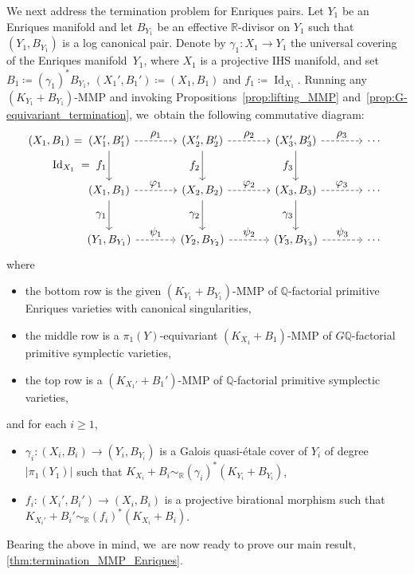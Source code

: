 \documentclass[JEP,XML,SOM,Unicode,published]{cedram}
\let\ts\textstyle
\theoremstyle{plain}
\theoremstyle{definition}
\newcommand{\Q}{\mathbb{Q}}
\newcommand{\R}{\mathbb{R}}
\DeclareMathOperator{\Id}{Id}
\begin{document}
We next address the termination problem for Enriques pairs. Let $Y_1$ be an Enriques manifold and let $B_{Y_1}$ be an effective $\R$\nobreakdash-divisor on $Y_1$ such that $(Y_1,B_{Y_1})$ is a log canonical pair. Denote by $\gamma_1 \colon X_1 \to Y_1$ the universal covering of the Enriques manifold~$Y_1$, where $X_1$ is a projective IHS manifold, and set $B_1 \coloneqq (\gamma_1)^* B_{Y_1}$, $(X_1',B_1') \coloneqq (X_1, B_1)$ and $f_1 \coloneqq \Id_{X_1}$. Running any $(K_{Y_1}+B_{Y_1})$-MMP and invoking Propositions~\ref{prop:lifting_MMP} and~\ref{prop:G-equivariant_termination}, we~obtain the following commutative diagram:
\begin{equation}
\label{diagram:Enriques_MMP_lifting}
\begin{tikzcd}[column sep = large, row sep = large, /tikz/column 1/.append style={column sep = 0pt, inner xsep = 0pt},]
(X_1, B_1) \hspace{1pt} =
& (X_1',B_1') \arrow[d, "\ts \Id_{X_1} \; = \; f_1" swap] \arrow[r, dashed, "\ts \rho_1"] & (X_2',B_2') \arrow[d, "\ts f_2" swap] \arrow[r, dashed, "\ts \rho_2"] & (X_3',B_3') \arrow[d, "\ts f_3" swap] \arrow[r, dashed, "\ts \rho_3"] & \cdots
\\
& (X_1,B_1) \arrow[d, "\ts \gamma_1" swap] \arrow[r, dashed, "\ts \varphi_1"] & (X_2,B_2) \arrow[d, "\ts \gamma_2" swap] \arrow[r, dashed, "\ts \varphi_2"] & (X_3,B_3) \arrow[d, "\ts \gamma_3" swap] \arrow[r, dashed, "\ts \varphi_3"] & \cdots
\\
& (Y_1, B_{Y_1}) \arrow[r, dashed, "\ts \psi_1"] & (Y_2, B_{Y_2}) \arrow[r, dashed, "\ts \psi_2"] & (Y_3, B_{Y_3}) \arrow[r, dashed, "\ts \psi_3"] & \cdots
\end{tikzcd}
\end{equation}
where
\begin{itemize}
\item
the bottom row is the given $(K_{Y_1}+B_{Y_1})$-MMP of $\Q$\nobreakdash-factorial primitive Enriques varieties with canonical singularities,

\item
the middle row is a $\pi_1(Y)$-equivariant $(K_{X_1} + B_1)$-MMP of $G\Q$-factorial primitive symplectic varieties,

\item
the top row is a $(K_{X_1'} + B_1')$-MMP of $\Q$\nobreakdash-factorial primitive symplectic varieties,
\end{itemize}
and for each $i \geq 1$,
\begin{itemize}
\item
$\gamma_i \colon (X_i,B_i) \to (Y_i,B_{Y_i})$ is a Galois quasi-étale cover of $Y_i$ of degree $|\pi_1(Y_1)|$ such that
$ K_{X_i} + B_i \sim_\R (\gamma_i)^* (K_{Y_i} + B_{Y_i}) $,

\item
$f_i \colon (X_i',B_i') \to (X_i,B_i)$ is a projective birational morphism such that
$ K_{X_i'} + B_i' \sim_\R (f_i)^* (K_{X_i} + B_i) $.
\end{itemize}
Bearing the above in mind, we~are now ready to prove our main result, \autoref{thm:termination_MMP_Enriques}.
\end{document}

